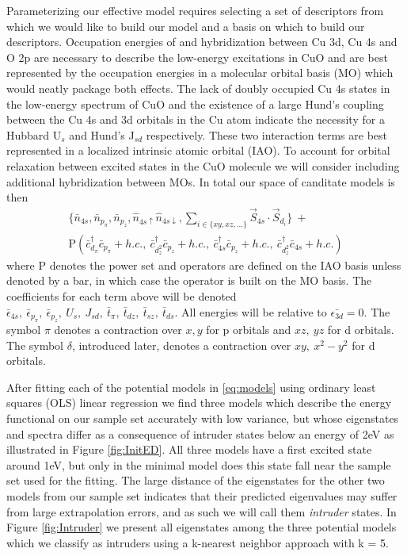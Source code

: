 \documentclass[12pt]{article}
\begin{document}
Parameterizing our effective model requires selecting a set of descriptors from which we would like to build our model and a basis on which to build our descriptors.
Occupation energies of and hybridization between Cu 3d, Cu 4s and O 2p are necessary to describe the low-energy excitations in CuO and are best represented by the occupation energies in a molecular orbital basis (MO) which would neatly package both effects.
The lack of doubly occupied Cu 4s states in the low-energy spectrum of CuO and the existence of a large Hund's coupling between the Cu 4s and 3d orbitals in the Cu atom indicate the necessity for a Hubbard U$_s$ and Hund's J$_{sd}$ respectively. 
These two interaction terms are best represented in a localized intrinsic atomic orbital (IAO).
To account for orbital relaxation between excited states in the CuO molecule we will consider including additional hybridization between MOs.
In total our space of canditate models is then 
\begin{equation}
\begin{split}
\{\bar{n}_{4s}, \bar{n}_{p_\pi}, \bar{n}_{p_z}, \hat{n}_{4s\uparrow} \hat{n}_{4s\downarrow},\sum_{i \in \{xy, xz,...\}}\vec{S}_{4s}\cdot \vec{S}_{d_i}\} \ + \\
\text{P}(\bar{c}_{d_\pi}^\dagger \bar{c}_{p_\pi} + h.c.,\ \bar{c}_{d_z^2}^\dagger \bar{c}_{p_z} + h.c.,\ \bar{c}_{4s}^\dagger \bar{c}_{p_z} + h.c.,\ \bar{c}_{d_z^2}^\dagger \bar{c}_{4s} + h.c.)
\end{split}
\label{eq:models}
\end{equation}
where P denotes the power set and operators are defined on the IAO basis unless denoted by a bar, in which case the operator is built on the MO basis. 
The coefficients for each term above will be denoted $\bar{\epsilon}_{4s},\ \bar{\epsilon}_{p_\pi},\ \bar{\epsilon}_{p_z},\ U_s,\ J_{sd},\ \bar{t}_\pi,\ \bar{t}_{dz},\ \bar{t}_{sz},\ \bar{t}_{ds}$. 
All energies will be relative to $\bar{\epsilon_{3d}} = 0$. 
The symbol $\pi$ denotes a contraction over $x, y$ for p orbitals and $xz,\ yz$ for d orbitals. The symbol $\delta$, introduced later, denotes a contraction over $xy,\ x^2-y^2$ for d orbitals.

After fitting each of the potential models in \eqref{eq:models} using ordinary least squares (OLS) linear regression we find three models which describe the energy functional on our sample set accurately with low variance, but whose eigenstates and spectra differ as a consequence of intruder states below an energy of 2eV as illustrated in Figure \ref{fig:InitED}. 
All three models have a first excited state around 1eV, but only in the minimal model does this state fall near the sample set used for the fitting.
The large distance of the eigenstates for the other two models from our sample set indicates that their predicted eigenvalues may suffer from large extrapolation errors, and as such we will call them \textit{intruder} states.
In Figure \ref{fig:Intruder} we present all eigenstates among the three potential models which we classify as intruders using a k-nearest neighbor approach with k = 5.
\end{document}
